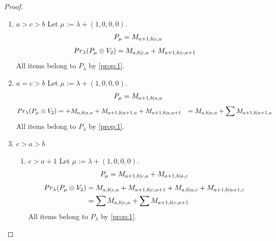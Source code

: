 \begin{proof}
\begin{enumerate}
\item $a>c>b$
        Let $\mu:=\lambda + (1,0,0,0) $. 
\begin{equation}\notag
  \begin{aligned}
      P_{\mu} =M_{a+1,b|c,a}
  \end{aligned}
\end{equation}
\begin{equation}\notag
  \begin{aligned}
  Pr_{\lambda}(P_\mu \otimes V_2) &=
M_{a,b|c,a}
+M_{a+1,b|c,a+1}
  \end{aligned}
\end{equation}
All items belong to $P_\lambda$ by \cref{prop:1}.
  
\item $a=c>b$
        Let $\mu:=\lambda + (1,0,0,0) $. 
\begin{equation}\notag
  \begin{aligned}
      P_{\mu} =
M_{a+1,b|a,a}
  \end{aligned}
\end{equation}
\begin{equation}\notag
  \begin{aligned}
  Pr_{\lambda}(P_\mu \otimes V_2) &=
+M_{a,b|a,a}
+M_{a+1,b|a+1,a}
+M_{a+1,b|a,a+1}
                                  &=
 M_{a,b|a,a}
+\sum M_{a+1,b|a+1,a}
  \end{aligned}
\end{equation}
All items belong to $P_\lambda$ by \cref{prop:1}.
  
\item $c>a>b$
  \begin{enumerate}
    \item $c>a+1$
        Let $\mu:=\lambda + (1,0,0,0) $. 
\begin{equation}\notag
  \begin{aligned}
      P_{\mu} =
M_{a+1,b|c,a}
+M_{a+1,b|a,c}
  \end{aligned}
\end{equation}
\begin{equation}\notag
  \begin{aligned}
  Pr_{\lambda}(P_\mu \otimes V_2) &=
M_{a,b|c,a}
+M_{a+1,b|c,a+1}
+M_{a,b|a,c}
+M_{a+1,b|a+1,c} \\
                                  &=
\sum M_{a,b|c,a}
+\sum M_{a+1,b|c,a+1}
  \end{aligned}
\end{equation}
All items belong to $P_\lambda$ by \cref{prop:1}.
    

\end{enumerate}
\end{enumerate}
\end{proof}
